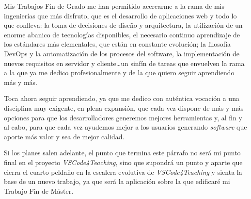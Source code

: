 Mis Trabajos Fin de Grado me han permitido acercarme a la rama de mis ingenierías que más disfruto, que es el desarrollo de aplicaciones web y todo lo que conlleva: la toma de decisiones de diseño y arquitectura, la utilización de un enorme abanico de tecnologías disponibles, el necesario continuo aprendizaje de los estándares más elementales, que están en constante evolución; la filosofía DevOps y la automatización de los procesos del software, la implementación de nuevos requisitos en servidor y cliente\dots un sinfín de tareas que envuelven la rama a la que ya me dedico profesionalmente y de la que quiero seguir aprendiendo más y más.

Toca ahora seguir aprendiendo, ya que me dedico con auténtica vocación a una disciplina muy exigente, en plena expansión, que cada vez dispone de más y más opciones para que los desarrolladores generemos mejores herramientas y, al fin y al cabo, para que cada vez ayudemos mejor a los usuarios generando \textit{software} que aporte más valor y sea de mejor calidad.

Si los planes salen adelante, el punto que termina este párrafo no será mi punto final en el proyecto \textit{VSCode4Teaching}, sino que supondrá un punto y aparte que cierra el cuarto peldaño en la escalera evolutiva de \textit{VSCode4Teaching} y sienta la base de un nuevo trabajo, ya que será la aplicación sobre la que edificaré mi Trabajo Fin de Máster.
